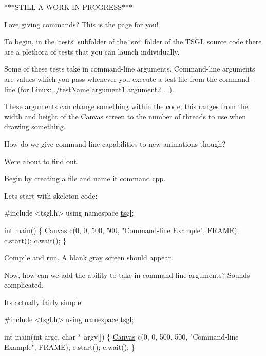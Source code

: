 $\ast$$\ast$$\ast$\+S\+T\+I\+L\+L A W\+O\+R\+K I\+N P\+R\+O\+G\+R\+E\+S\+S$\ast$$\ast$$\ast$

Love giving commands? This is the page for you!

To begin, in the \char`\"{}tests\char`\"{} subfolder of the \char`\"{}src\char`\"{} folder of the T\+S\+G\+L source code there are a plethora of tests that you can launch individually.

Some of these tests take in command-\/line arguments. Command-\/line arguments are values which you pass whenever you execute a test file from the command-\/line (for Linux\+: ./test\+Name argument1 argument2 ...).

These arguments can change something within the code; this ranges from the width and height of the Canvas screen to the number of threads to use when drawing something.

How do we give command-\/line capabilities to new animations though?

We\textquotesingle{}re about to find out.

Begin by creating a file and name it command.\+cpp.

Let\textquotesingle{}s start with skeleton code\+:


\begin{DoxyCode}
\textcolor{preprocessor}{#include <tsgl.h>}
\textcolor{keyword}{using namespace }\hyperlink{namespacetsgl}{tsgl};

\textcolor{keywordtype}{int} main() \{
  \hyperlink{classtsgl_1_1_canvas}{Canvas} c(0, 0, 500, 500, \textcolor{stringliteral}{"Command-line Example"}, FRAME);
  c.start();
  c.wait();
\}
\end{DoxyCode}


Compile and run. A blank gray screen should appear.

Now, how can we add the ability to take in command-\/line arguments? Sounds complicated.

Its actually fairly simple\+:


\begin{DoxyCode}
\textcolor{preprocessor}{#include <tsgl.h>}
\textcolor{keyword}{using namespace }\hyperlink{namespacetsgl}{tsgl};

\textcolor{keywordtype}{int} main(\textcolor{keywordtype}{int} argc, \textcolor{keywordtype}{char} * argv[]) \{
  \hyperlink{classtsgl_1_1_canvas}{Canvas} c(0, 0, 500, 500, \textcolor{stringliteral}{"Command-line Example"}, FRAME);
  c.start();
  c.wait();
\}
\end{DoxyCode}



